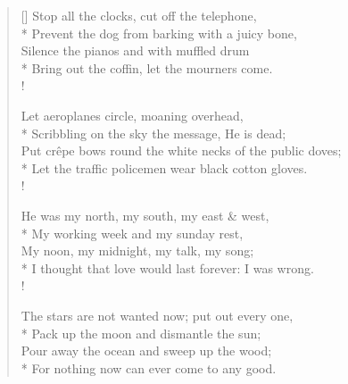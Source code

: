 \documentclass[MAIN]{subfiles}
\begin{document}
\settowidth{\versewidth}{Stop all the clocks, cut off the telephone,}
\begin{verse}[\versewidth]
Stop all the clocks, cut off the telephone,\\*
Prevent the dog from barking with a juicy bone,\\
Silence the pianos and with muffled drum\\*
Bring out the coffin, let the mourners come.\\!

Let aeroplanes circle, moaning overhead,\\*
Scribbling on the sky the message, He is dead;\\
Put cr{\^e}pe bows round the white necks of the public doves;\\*
Let the traffic policemen wear black cotton gloves.\\!

He was my north, my south, my east \& west,\\*
My working week and my sunday rest,\\
My noon, my midnight, my talk, my song;\\*
I thought that love would last forever: I was wrong.\\!

The stars are not wanted now; put out every one,\\*
Pack up the moon and dismantle the sun;\\
Pour away the ocean and sweep up the wood;\\*
For nothing now can ever come to any good.
\end{verse}
\end{document}
